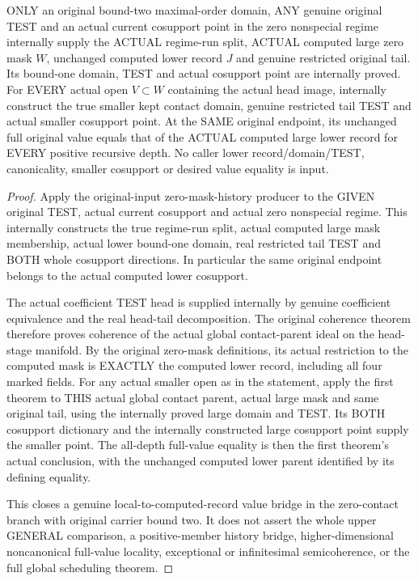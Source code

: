 \begin{theorem}
\label{hir:original-computed-zero-mask-curve-full-values}
\leanok
ONLY an original bound-two maximal-order domain, ANY genuine original
TEST and an actual current cosupport point in the zero nonspecial
regime internally supply the ACTUAL regime-run split, ACTUAL computed
large zero mask $W$, unchanged computed lower record $J$ and genuine
restricted original tail. Its bound-one domain, TEST and actual
cosupport point are internally proved. For EVERY actual open $V\subset W$
containing the actual head image, internally construct the true smaller
kept contact domain, genuine restricted tail TEST and actual smaller
cosupport point. At the SAME original endpoint, its unchanged full
original value equals that of the ACTUAL computed large lower record
for EVERY positive recursive depth. No caller lower record/domain/TEST,
canonicality, smaller cosupport or desired value equality is input.
\end{theorem}
\begin{proof}
Apply the original-input zero-mask-history producer to the GIVEN
original TEST, actual current cosupport and actual zero nonspecial
regime. This internally constructs the true regime-run split, actual
computed large mask membership, actual lower bound-one domain, real
restricted tail TEST and BOTH whole cosupport directions. In particular
the same original endpoint belongs to the actual computed lower
cosupport.

The actual coefficient TEST head is supplied internally by genuine
coefficient equivalence and the real head-tail decomposition. The
original coherence theorem therefore proves coherence of the actual
global contact-parent ideal on the head-stage manifold. By the original
zero-mask definitions, its actual restriction to the computed mask is
EXACTLY the computed lower record, including all four marked fields.
For any actual smaller open as in the statement, apply the first
theorem to THIS actual global contact parent, actual large mask and
same original tail, using the internally proved large domain and TEST.
Its BOTH cosupport dictionary and the internally constructed large
cosupport point supply the smaller point. The all-depth full-value
equality is then the first theorem's actual conclusion, with the
unchanged computed lower parent identified by its defining equality.

This closes a genuine local-to-computed-record value bridge in the
zero-contact branch with original carrier bound two. It does not assert
the whole upper GENERAL comparison, a positive-member history bridge,
higher-dimensional noncanonical full-value locality, exceptional or
infinitesimal semicoherence, or the full global scheduling theorem.
\end{proof}

